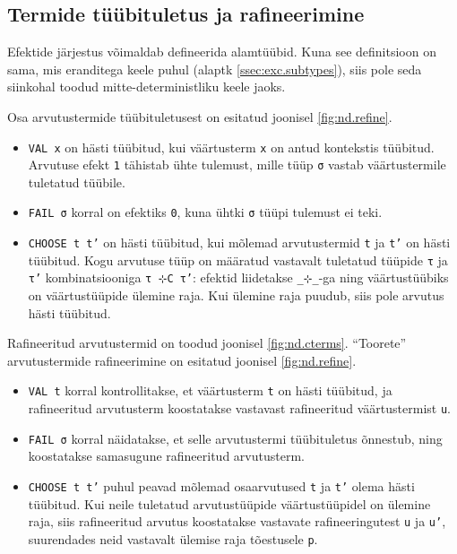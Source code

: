 \documentclass[a4paper,12pt]{article}
\begin{document}
\subsection{Termide tüübituletus ja rafineerimine}

Efektide järjestus võimaldab defineerida alamtüübid.
Kuna see definitsioon on sama, mis eranditega keele puhul (alaptk \ref{ssec:exc.subtypes}), siis pole seda siinkohal toodud mitte-deterministliku keele jaoks.

Osa arvutustermide tüübituletusest on esitatud joonisel \ref{fig:nd.refine}.
\begin{itemize}
\item {\tt VAL x} on hästi tüübitud, kui väärtusterm {\tt x} on antud kontekstis tüübitud. Arvutuse efekt {\tt 1} tähistab ühte tulemust, mille tüüp {\tt σ} vastab väärtustermile tuletatud tüübile.
\item {\tt FAIL σ} korral on efektiks {\tt 0}, kuna ühtki {\tt σ} tüüpi tulemust ei teki.
\item {\tt CHOOSE t t'} on hästi tüübitud, kui mõlemad arvutustermid {\tt t} ja {\tt t'} on hästi tüübitud. Kogu arvutuse tüüp on määratud vastavalt tuletatud tüüpide {\tt τ} ja {\tt τ'} kombinatsiooniga {\tt τ ⊹C τ'}: efektid liidetakse {\tt _⊹_}-ga ning väärtustüübiks on väärtustüüpide ülemine raja. Kui ülemine raja puudub, siis pole arvutus hästi tüübitud.
\end{itemize}

Rafineeritud arvutustermid on toodud joonisel \ref{fig:nd.cterms}.
``Toorete'' arvutustermide rafineerimine on esitatud joonisel \ref{fig:nd.refine}.
\begin{itemize}
\item {\tt VAL t} korral kontrollitakse, et väärtusterm {\tt t} on hästi tüübitud, ja rafineeritud arvutusterm koostatakse vastavast rafineeritud väärtustermist {\tt u}.
\item {\tt FAIL σ} korral näidatakse, et selle arvutustermi tüübituletus õnnestub, ning koostatakse samasugune rafineeritud arvutusterm.
\item {\tt CHOOSE t t'} puhul peavad mõlemad osaarvutused {\tt t} ja {\tt t'} olema hästi tüübitud. Kui neile tuletatud arvutustüüpide väärtustüüpidel on ülemine raja, siis rafineeritud arvutus koostatakse vastavate rafineeringutest {\tt u} ja {\tt u'}, suurendades neid vastavalt ülemise raja tõestusele {\tt p}.
\end{itemize}
\end{document}
